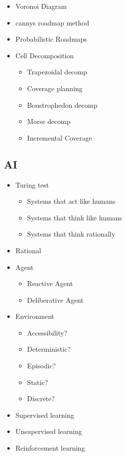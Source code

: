 \documentclass[a4paper,11pt]{article}
\begin{document}
\begin{itemize}
\begin{itemize}
            \item Voronoi Diagram
            \item cannys roadmap method
            \item Probabilistic Roadmaps
            \item Cell Decomposition
                \begin{itemize}
                    \item Trapezoidal decomp
                    \item Coverage planning
                    \item Boustrophedon decomp
                    \item Morse decomp
                    \item Incremental Coverage
                \end{itemize}
            \end{itemize}
    \end{itemize}

\subsection{AI}

\begin{itemize}
    \item Turing test
        \begin{itemize}
            \item Systems that act like humans
            \item Systems that think like humans
            \item Systems that think rationally
        \end{itemize}
    \item Rational
    \item Agent
        \begin{itemize}
            \item Reactive Agent
            \item Deliberative Agent
        \end{itemize}
    \item Environment 
        \begin{itemize}
            \item Accessibility?
            \item Deterministic?
            \item Episodic?
            \item Static?
            \item Discrete?
        \end{itemize}
    \item Supervised learning
    \item Unsupervised learning
    \item Reinforcement learning
        
\end{itemize}
\end{document}
